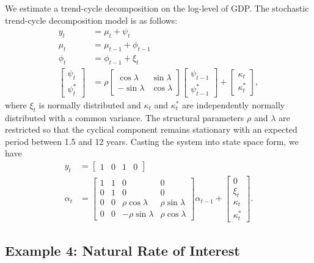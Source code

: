 \documentclass{article}
\begin{document}
We estimate a trend-cycle decomposition on the log-level of GDP. The stochastic trend-cycle decomposition model is as follows:
  \begin{align*}
  y_t &= \mu_t + \psi_t \\
  \mu_t &= \mu_{t-1} + \phi_{t-1} \\
  \phi_t &= \phi_{t-1} + \xi_t \\
  \begin{bmatrix} \psi_t \\ \psi_t^* \end{bmatrix} &=
  \rho \begin{bmatrix} \cos \lambda & \sin \lambda \\ -\sin \lambda & \cos \lambda \end{bmatrix}
  \begin{bmatrix} \psi_{t-1} \\ \psi_{t-1}^* \end{bmatrix} +
  \begin{bmatrix} \kappa_t \\ \kappa_t^* \end{bmatrix},
  \end{align*}
where $\xi_t$ is normally distributed and $\kappa_t$ and $\kappa_t^*$ are independently normally distributed with a common variance. The structural parameters $\rho$ and $\lambda$ are restricted so that the cyclical component remains stationary with an expected period between 1.5 and 12 years. Casting the system into state space form, we have
  \begin{align*}
  y_t &= \begin{bmatrix} 1 & 0 & 1 & 0 \end{bmatrix} \\
  \alpha_t &=
  \begin{bmatrix} 1 & 1 & 0 & 0 \\ 0 & 1 & 0 & 0 \\ 0 & 0 & \rho \cos \lambda & \rho \sin \lambda \\ 0 & 0 & -\rho \sin \lambda & \rho \cos \lambda \end{bmatrix} \alpha_{t-1} +
  \begin{bmatrix} 0 \\ \xi_t \\ \kappa_t \\ \kappa_t^* \end{bmatrix}.
  \end{align*}


\subsection{Example 4: Natural Rate of Interest}
\end{document}

